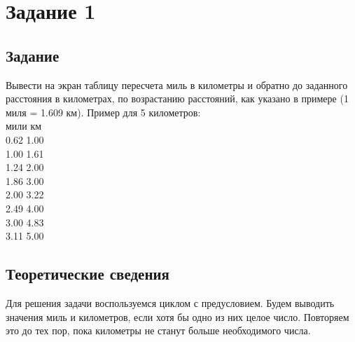\documentclass[12pt,a4paper]{report}
\begin{document}
\section{Задание 1}
\subsection{Задание}
Вывести на экран таблицу пересчета миль в километры и обратно до заданного расстояния в километрах, по возрастанию расстояний, как указано в примере (1 миля = 1.609 км). Пример для 5 километров: \\
мили  км \\
0.62 1.00 \\
1.00 1.61 \\
1.24 2.00 \\
1.86 3.00 \\
2.00 3.22 \\
2.49 4.00 \\
3.00 4.83 \\
3.11 5.00 \\
\subsection{Теоретические сведения}

Для решения задачи воспользуемся циклом с предусловием. Будем выводить значения миль и километров, если хотя бы одно из них целое число. Повторяем это до тех пор, пока километры не станут больше необходимого числа. 
\end{document}
